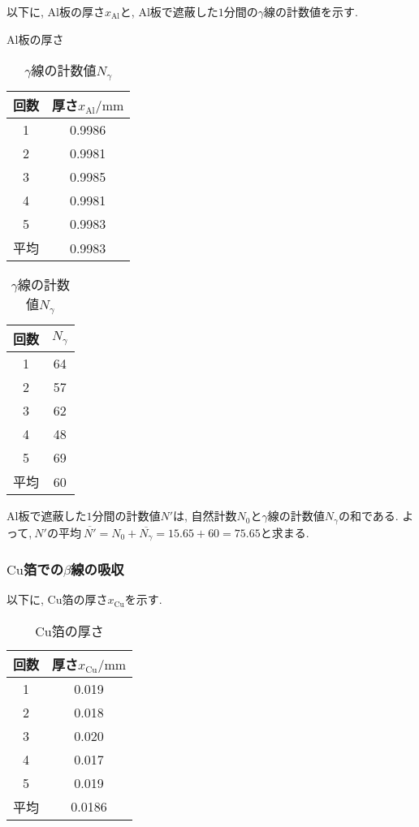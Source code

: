 \documentclass{jarticle}
\begin{document}
以下に, $\mathrm{Al}$板の厚さ$x_\mathrm{Al}$と, $\mathrm{Al}$板で遮蔽した$1$分間の$\gamma$線の計数値を示す.

\begin{table}[H]
  \begin{minipage}[t]{0.45\textwidth}
    \centering
    \caption{$\mathrm{Al}$板の厚さ}
    \label{tb:Al-plate-thickness}
    \begin{tabular}{cc}
      \hline
      回数 & 厚さ$x_\mathrm{Al}/\mathrm{mm}$ \\
      \hline
      1 & 0.9986 \\
      2 & 0.9981 \\
      3 & 0.9985 \\
      4 & 0.9981 \\
      5 & 0.9983 \\
      \hline
      平均 & 0.9983 \\
      \hline
    \end{tabular}
  \end{minipage}
  \begin{minipage}[t]{0.45\textwidth}
    \centering
    \caption{$\gamma$線の計数値$N_\gamma$}
    \label{tb:gamma-count-distribution}
    \begin{tabular}{cc}
      \hline
      回数 & $N_\gamma$ \\
      \hline
      1 & 64 \\
      2 & 57 \\
      3 & 62 \\
      4 & 48 \\
      5 & 69 \\
      \hline
      平均 & 60 \\
      \hline
    \end{tabular}
  \end{minipage}
\end{table}

$\mathrm{Al}$板で遮蔽した$1$分間の計数値$N'$は, 自然計数$N_0$と$\gamma$線の計数値$N_\gamma$の和である.
よって,$\ N'$の平均$\ \overline{N'} = N_0 + \overline{N_\gamma} = 15.65 + 60 = 75.65$と求まる.


\subsubsection{$\mathrm{Cu}$箔での$\beta$線の吸収}

以下に, $\mathrm{Cu}$箔の厚さ$x_\mathrm{Cu}$を示す.

\begin{table}[H]
  \centering
  \caption{$\mathrm{Cu}$箔の厚さ}
  \label{tb:Cu-foil-thickness}
  \begin{tabular}{cc}
    \hline
    回数 & 厚さ$x_\mathrm{Cu}/\mathrm{mm}$ \\
    \hline
    1 & 0.019 \\
    2 & 0.018 \\
    3 & 0.020 \\
    4 & 0.017 \\
    5 & 0.019 \\
    \hline
    平均 & 0.0186 \\
    \hline
  \end{tabular}
\end{table}
\end{document}
